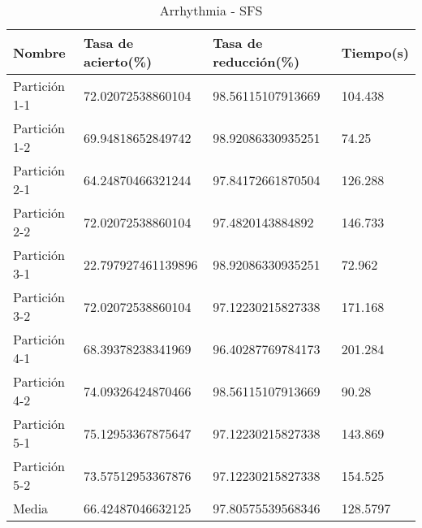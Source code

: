 \begin{table}[H]
	\centering
	\caption{Arrhythmia - SFS}
	\label{ARRH-SFS}
	\begin{tabular}{l|lll}
		Nombre        & Tasa de acierto(\%) & Tasa de reducción(\%) & Tiempo(s) \\ \hline
		Partición 1-1 & 72.02072538860104   & 98.56115107913669     & 104.438   \\
		Partición 1-2 & 69.94818652849742   & 98.92086330935251     & 74.25     \\
		Partición 2-1 & 64.24870466321244   & 97.84172661870504     & 126.288   \\
		Partición 2-2 & 72.02072538860104   & 97.4820143884892      & 146.733   \\
		Partición 3-1 & 22.797927461139896  & 98.92086330935251     & 72.962    \\
		Partición 3-2 & 72.02072538860104   & 97.12230215827338     & 171.168   \\
		Partición 4-1 & 68.39378238341969   & 96.40287769784173     & 201.284   \\
		Partición 4-2 & 74.09326424870466   & 98.56115107913669     & 90.28     \\
		Partición 5-1 & 75.12953367875647   & 97.12230215827338     & 143.869   \\
		Partición 5-2 & 73.57512953367876   & 97.12230215827338     & 154.525   \\ \hline
		Media         & 66.42487046632125   & 97.80575539568346     & 128.5797 
	\end{tabular}
\end{table}